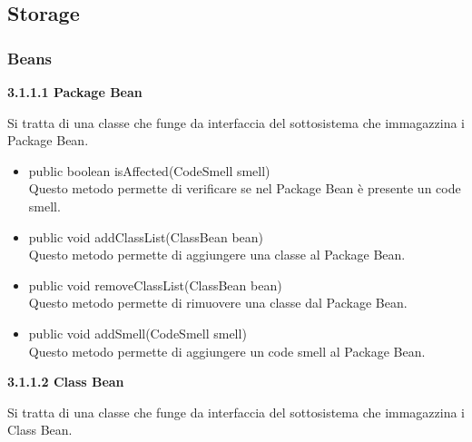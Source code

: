 \documentclass[11pt]{article}
\begin{document}
			
			
			\subsection{Storage}
			
			\subsubsection{Beans}
			\begin{description}
				\item \textbf{3.1.1.1  Package Bean}
				\item Si tratta di una classe che funge da interfaccia del sottosistema che immagazzina i Package Bean.
				
				\begin{itemize}
					\item public boolean isAffected(CodeSmell smell)\\
					Questo metodo permette di verificare se nel Package Bean è presente un code smell.
					\item public void addClassList(ClassBean bean)\\
					Questo metodo permette di aggiungere una classe al Package Bean.
					\item public void removeClassList(ClassBean bean)\\
					Questo metodo permette di rimuovere una classe dal Package Bean.
					\item public void addSmell(CodeSmell smell)\\
					Questo metodo permette di aggiungere un code smell al Package Bean.				
				\end{itemize}
				\newpage
				\item \textbf{3.1.1.2  Class Bean} 
				\item Si tratta di una classe che funge da interfaccia del sottosistema che immagazzina i Class Bean. 
				

\end{description}
\end{document}
